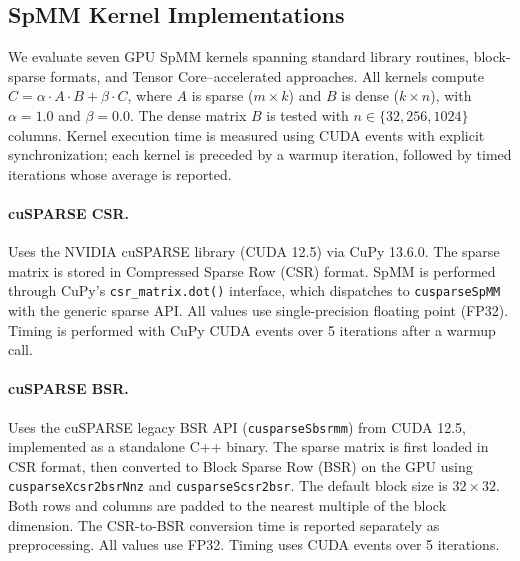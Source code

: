 
\subsection{SpMM Kernel Implementations}

We evaluate seven GPU SpMM kernels spanning standard library routines, block-sparse formats, and Tensor Core--accelerated approaches.
All kernels compute $C = \alpha \cdot A \cdot B + \beta \cdot C$, where $A$ is sparse ($m \times k$) and $B$ is dense ($k \times n$), with $\alpha = 1.0$ and $\beta = 0.0$.
The dense matrix $B$ is tested with $n \in \{32, 256, 1024\}$ columns.
Kernel execution time is measured using CUDA events with explicit synchronization; each kernel is preceded by a warmup iteration, followed by timed iterations whose average is reported.

\paragraph{cuSPARSE CSR.}
Uses the NVIDIA cuSPARSE library (CUDA 12.5) via CuPy 13.6.0.
The sparse matrix is stored in Compressed Sparse Row (CSR) format.
SpMM is performed through CuPy's \texttt{csr\_matrix.dot()} interface, which dispatches to \texttt{cusparseSpMM} with the generic sparse API.
All values use single-precision floating point (FP32).
Timing is performed with CuPy CUDA events over 5 iterations after a warmup call.

\paragraph{cuSPARSE BSR.}
Uses the cuSPARSE legacy BSR API (\texttt{cusparseSbsrmm}) from CUDA 12.5, implemented as a standalone C++ binary.
The sparse matrix is first loaded in CSR format, then converted to Block Sparse Row (BSR) on the GPU using \texttt{cusparseXcsr2bsrNnz} and \texttt{cusparseScsr2bsr}.
The default block size is $32 \times 32$.
Both rows and columns are padded to the nearest multiple of the block dimension.
The CSR-to-BSR conversion time is reported separately as preprocessing.
All values use FP32. Timing uses CUDA events over 5 iterations.

